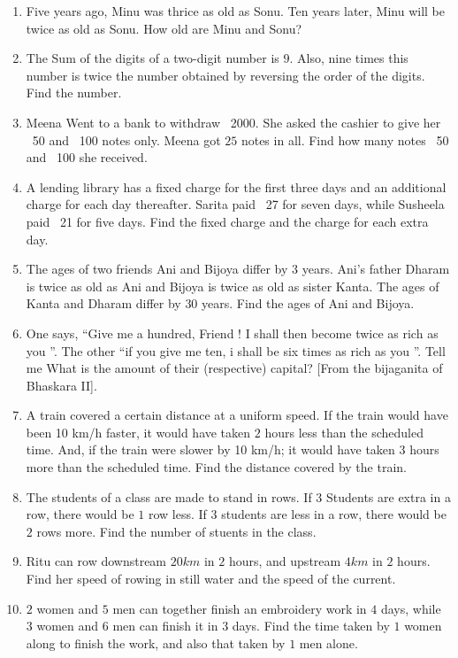 \begin{enumerate}[label=\thesubsection.\arabic*, ref=\thesubsection.\theenumi]
\item Five years ago,  Minu was thrice as old as Sonu.  Ten years later,  Minu will be twice as old as Sonu.  How old are Minu and Sonu?
\item The Sum of the digits of a two-digit number is $9$.  Also,  nine times this number is twice the number obtained by reversing the order of the digits.  Find the number. 
\item Meena Went to a bank to withdraw \rupee~2000.  She asked the cashier to give her \rupee~50 and \rupee~100 notes only.  Meena got $25$ notes in all.  Find how many notes \rupee~50 and \rupee~100 she received. 
\item A lending library has a fixed charge for the first three days and an additional charge for each day thereafter.  Sarita paid \rupee~27 for seven days,  while Susheela paid \rupee~21 for five days.  Find the fixed charge and the charge for each extra day.   
\item The ages of two friends Ani and Bijoya differ  by $3$  years.  Ani's father Dharam is twice as old as Ani and Bijoya is twice as old as sister Kanta.  The ages of Kanta and Dharam differ by $30$ years.  Find the ages of Ani and Bijoya. 
\item  One says,  \textquotedblleft Give me a hundred,  Friend !  I shall then become twice as rich as you \textquotedblright.  The other \textquotedblleft  if you give me ten,  i shall be six times as rich as you \textquotedblright.   Tell me What is the amount of their (respective) capital? [From the bijaganita of Bhaskara II].  
\item A train covered a certain distance at a uniform speed.  If the train would have been 10 km/h faster,  it would have taken $2$ hours less than the scheduled time.  And,  if the train were slower by 10 km/h; it would have taken $3$ hours more than the scheduled time.  Find the distance covered by the train. 
\item The students of a class are made to stand in rows.  If 3 Students are extra in a row,  there would be $1$ row less.  If $3$ students are less in a row,  there would be $2$ rows more.  Find the number of stuents in the class. 
\item Ritu can row downstream $20km$ in $2$ hours, and upstream $4km$ in $2$ hours. Find her speed of rowing in still water and the speed of the current. 
\item $2$ women and $5$ men can together finish an embroidery work in $4$ days,  while $3$ women and $6$ men can finish it in $3$ days.  Find the time taken by $1$ women along to finish the work, and also that taken by $1$ men alone. 

\end{enumerate}
